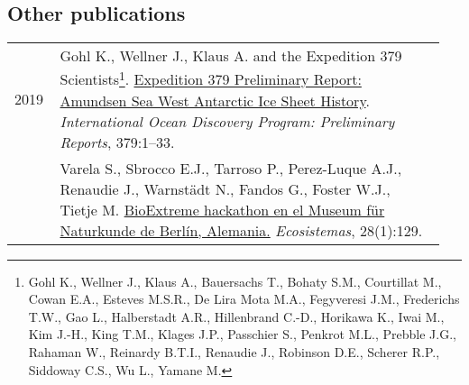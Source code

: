 \documentclass[11pt, a4paper]{article}
\makeatletter
\newcommand\footnoteref[1]{\protected@xdef\@thefnmark{\ref{#1}}\@footnotemark}
\makeatother
\begin{document}
\subsection{Other publications}
\begin{longtable}{p{0.1\linewidth} P{0.85\linewidth}}
2019 & Gohl K., Wellner J., Klaus A. and the Expedition 379 Scientists\footnote{\label{exp379scientists}Gohl K., Wellner J., Klaus A., Bauersachs T., Bohaty S.M., Courtillat M., Cowan E.A., Esteves M.S.R., De Lira Mota M.A., Fegyveresi J.M., Frederichs T.W., Gao L., Halberstadt A.R., Hillenbrand C.-D., Horikawa K., Iwai M., Kim J.-H., King T.M., Klages J.P., Passchier S., Penkrot M.L., Prebble J.G., Rahaman W., Reinardy B.T.I., Renaudie J., Robinson D.E., Scherer R.P., Siddoway C.S., Wu L., Yamane M.}. \href{http://publications.iodp.org/preliminary_report/379/index.html}{Expedition 379 Preliminary Report: Amundsen Sea West Antarctic Ice Sheet History}. \textit{International Ocean Discovery Program: Preliminary Reports}, 379:1--33.\\
  & Varela S., Sbrocco E.J., Tarroso P., Perez-Luque A.J., Renaudie J., Warnst\"{a}dt N., Fandos G., Foster W.J., Tietje M. \href{http://dx.doi.org/10.7818/ECOS.1707}{BioExtreme hackathon en el Museum f\"{u}r Naturkunde de Berlín, Alemania.} \textit{Ecosistemas}, 28(1):129.\\
\end{longtable}
\end{document}

